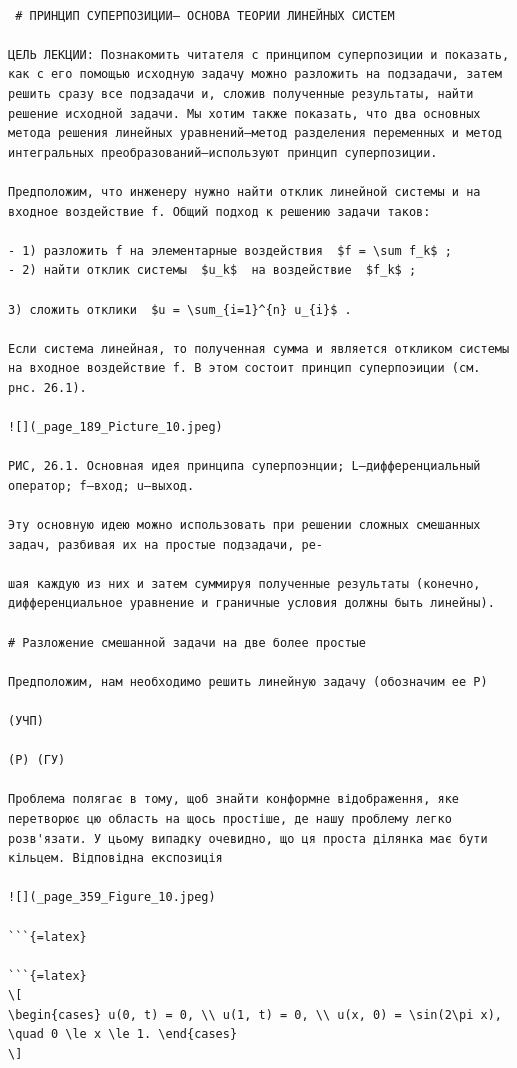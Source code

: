 \documentclass[
]{article}
\begin{document}
\begin{verbatim}

 # ПРИНЦИП СУПЕРПОЗИЦИИ— ОСНОВА ТЕОРИИ ЛИНЕЙНЫХ СИСТЕМ

ЦЕЛЬ ЛЕКЦИИ: Познакомить читателя с принципом суперпозиции и показать, как с его помощью исходную задачу можно разложить на подзадачи, затем решить сразу все подзадачи и, сложив полученные результаты, найти решение исходной задачи. Мы хотим также показать, что два основных метода решения линейных уравнений—метод разделения переменных и метод интегральных преобразований—используют принцип суперпозиции.

Предположим, что инженеру нужно найти отклик линейной системы и на входное воздействие f. Общий подход к решению задачи таков:

- 1) разложить f на элементарные воздействия  $f = \sum f_k$ ;
- 2) найти отклик системы  $u_k$  на воздействие  $f_k$ ;

3) сложить отклики  $u = \sum_{i=1}^{n} u_{i}$ .

Если система линейная, то полученная сумма и является откликом системы на входное воздействие f. В этом состоит принцип суперпоэиции (см. рнс. 26.1).

![](_page_189_Picture_10.jpeg)

РИС, 26.1. Основная идея принципа суперпоэнции; L—дифференциальный оператор; f—вход; u—выход.

Эту основную идею можно использовать при решении сложных смешанных задач, разбивая их на простые подзадачи, ре-

шая каждую из них и затем суммируя полученные результаты (конечно, дифференциальное уравнение и граничные условия должны быть линейны).

# Разложение смешанной задачи на две более простые

Предположим, нам необходимо решить линейную задачу (обозначим ее P)

(УЧП)

(Р) (ГУ)

Проблема полягає в тому, щоб знайти конформне відображення, яке перетворює цю область на щось простіше, де нашу проблему легко розв'язати. У цьому випадку очевидно, що ця проста ділянка має бути кільцем. Відповідна експозиція

![](_page_359_Figure_10.jpeg)

```{=latex}

```{=latex}
\[
\begin{cases} u(0, t) = 0, \\ u(1, t) = 0, \\ u(x, 0) = \sin(2\pi x), \quad 0 \le x \le 1. \end{cases}
\]
\end{verbatim}
\end{document}

